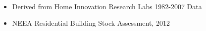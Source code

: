 \begin{itemize}
\item Derived from Home Innovation Research Labs 1982-2007 Data
\item NEEA Residential Building Stock Assessment, 2012
\end{itemize}
